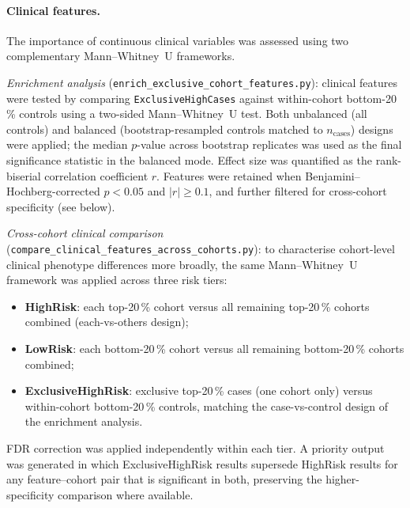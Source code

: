 \paragraph{Clinical features.}
The importance of continuous clinical variables was assessed using two complementary Mann--Whitney~U frameworks.

\textit{Enrichment analysis} (\texttt{enrich\_exclusive\_cohort\_features.py}): clinical features were tested by comparing \texttt{ExclusiveHighCases} against within-cohort bottom-20\,\% controls using a two-sided Mann--Whitney~U test.
Both unbalanced (all controls) and balanced (bootstrap-resampled controls matched to $n_\text{cases}$) designs were applied; the median $p$-value across bootstrap replicates was used as the final significance statistic in the balanced mode.
Effect size was quantified as the rank-biserial correlation coefficient $r$.
Features were retained when Benjamini--Hochberg-corrected $p < 0.05$ and $|r| \geq 0.1$, and further filtered for cross-cohort specificity (see below).

\textit{Cross-cohort clinical comparison} (\texttt{compare\_clinical\_features\_across\_cohorts.py}): to characterise cohort-level clinical phenotype differences more broadly, the same Mann--Whitney~U framework was applied across three risk tiers:
\begin{itemize}
  \item \textbf{HighRisk}: each top-20\,\% cohort versus all remaining top-20\,\% cohorts combined (each-vs-others design);
  \item \textbf{LowRisk}: each bottom-20\,\% cohort versus all remaining bottom-20\,\% cohorts combined;
  \item \textbf{ExclusiveHighRisk}: exclusive top-20\,\% cases (one cohort only) versus within-cohort bottom-20\,\% controls, matching the case-vs-control design of the enrichment analysis.
\end{itemize}
FDR correction was applied independently within each tier.
A priority output was generated in which ExclusiveHighRisk results supersede HighRisk results for any feature--cohort pair that is significant in both, preserving the higher-specificity comparison where available.

